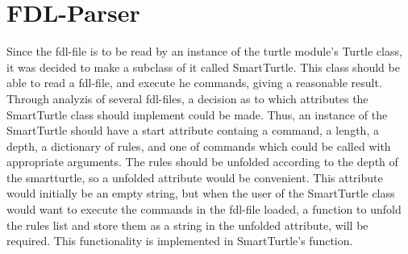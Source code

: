 \documentclass[titlepage]{article}
\begin{document}
\section{FDL-Parser}
Since the fdl-file is to be read by an instance of the turtle module's Turtle class, it was decided to make a subclass of it called SmartTurtle. This class should be able to read a fdl-file, and execute he commands, giving a reasonable result. Through analyzis of several fdl-files, a decision as to which attributes the SmartTurtle class should implement could be made. Thus, an instance of the SmartTurtle should have a start attribute containg a command, a length, a depth, a dictionary of rules, and one of commands which could be called with appropriate arguments. The rules should be unfolded according to the depth of the smartturtle, so a unfolded attribute would be convenient. This attribute would initially be an empty string, but when the user of the SmartTurtle class would want to execute the commands in the fdl-file loaded, a function to unfold the rules list and store them as a string in the unfolded attribute, will be required. This functionality is implemented in SmartTurtle's  function.
\end{document}
